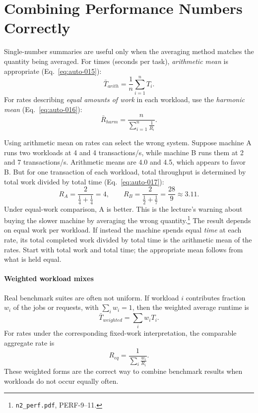 \section{Combining Performance Numbers Correctly}\label{sec:auto-016}
Single-number summaries are useful only when the averaging method matches the quantity being averaged.
For times (seconds per task), \textit{arithmetic mean} is appropriate (Eq.~\eqref{eq:auto-015}):
\begin{equation}\label{eq:auto-015}
    \bar{T}_{arith}=\frac{1}{n}\sum_{i=1}^{n}T_i.
\end{equation}
For rates describing \emph{equal amounts of work} in each workload, use the \textit{harmonic mean} (Eq.~\eqref{eq:auto-016}):
\begin{equation}\label{eq:auto-016}
    \bar{R}_{harm}=\frac{n}{\sum_{i=1}^{n}\frac{1}{R_i}}.
\end{equation}

Using arithmetic mean on rates can select the wrong system.
Suppose machine A runs two workloads at 4 and 4 transactions/s, while machine B runs them at 2 and 7 transactions/s.
Arithmetic means are 4.0 and 4.5, which appears to favor B\@.
But for one transaction of each workload, total throughput is determined by total work divided by total time (Eq.~\eqref{eq:auto-017}):
\begin{equation}\label{eq:auto-017}
    R_A=\frac{2}{\frac{1}{4}+\frac{1}{4}}=4,\qquad
    R_B=\frac{2}{\frac{1}{2}+\frac{1}{7}}=\frac{28}{9}\approx 3.11.
\end{equation}
Under equal-work comparison, A is better.
This is the lecture's warning about buying the slower machine by averaging the wrong quantity.\footnote{\texttt{n2\_perf.pdf}, PERF-9--11.}
The result depends on equal work per workload.
If instead the machine spends equal \emph{time} at each rate, its total completed work divided by total time is the arithmetic mean of the rates.
Start with total work and total time; the appropriate mean follows from what is held equal.

\paragraph{Weighted workload mixes}\label{par:auto-011a}
Real benchmark suites are often not uniform.
If workload $i$ contributes fraction $w_i$ of the jobs or requests, with $\sum_i w_i=1$, then the weighted average runtime is
\begin{equation}\label{eq:auto-016a}
    \bar{T}_{weighted}=\sum_i w_i T_i.
\end{equation}
For rates under the corresponding fixed-work interpretation, the comparable aggregate rate is
\begin{equation}\label{eq:auto-016b}
    R_{eq}=\frac{1}{\sum_i \frac{w_i}{R_i}}.
\end{equation}
These weighted forms are the correct way to combine benchmark results when workloads do not occur equally often.

